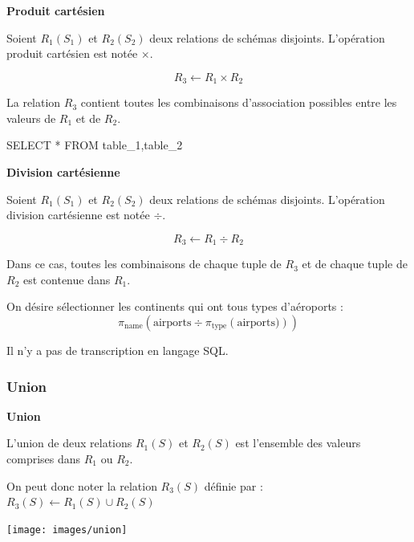 \documentclass[10pt]{article}
\begin{document}
\begin{defi}

\textbf{Produit cartésien}

Soient $R_1(S_1)$ et $R_2(S_2)$ deux relations de schémas disjoints. L'opération produit cartésien est notée $\times$. 

$$
R_3 \leftarrow R_1 \times R_2
$$

La relation $R_3$ contient toutes les combinaisons d'association possibles entre les valeurs de $R_1$ et de $R_2$.

\begin{envsql}
\begin{sql}
SELECT * FROM table_1,table_2
\end{sql}
\end{envsql}

\end{defi}



\begin{defi}

\textbf{Division cartésienne}

Soient $R_1(S_1)$ et $R_2(S_2)$ deux relations de schémas disjoints. L'opération division cartésienne est notée $\div$. 

$$
R_3 \leftarrow R_1 \div R_2
$$

Dans ce cas, toutes les combinaisons de chaque tuple de $R_3$ et de chaque tuple de $R_2$ est contenue dans $R_1$.

\end{defi}


\begin{exemple}
On désire sélectionner les continents qui ont tous types d'aéroports :
$$
\pi_{\text{name}}\left(\text{airports} \div \pi_{\text{type}}\left( \text{airports})\right)\right)
$$

Il n'y a pas de transcription en langage SQL.
\end{exemple}



\subsubsection{Union}

\begin{defi}
\begin{minipage}[c]{.75\linewidth}
\textbf{Union}

L'union de deux relations $R_1(S)$ et $R_2(S)$ est l'ensemble des valeurs comprises dans $R_1$ ou $R_2$. 

On peut donc noter la relation $R_3(S)$ définie par : $R_3(S)\leftarrow R_1(S)\cup R_2(S)$
\end{minipage}\hfill
\begin{minipage}[c]{.2\linewidth}
\begin{center}
\texttt{[image: images/union]}
\end{center}
\end{minipage}

\end{defi}
\end{document}

